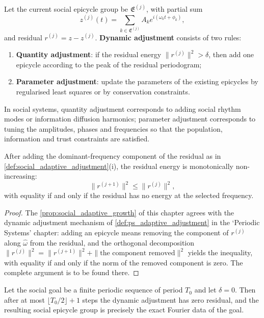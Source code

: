 \begin{definition}\label{def:social_adaptive_adjustment}
Let the current social epicycle group be $\mathfrak E^{(j)}$, with partial sum
\[
z^{(j)}(t)=\sum_{k\in\mathfrak E^{(j)}}A_k e^{i(\omega_k t+\phi_k)},
\]
and residual $r^{(j)}=z-z^{(j)}$. \textbf{Dynamic adjustment} consists of two rules:
\begin{enumerate}[label=(\roman*)]
    \item \textbf{Quantity adjustment}: if the residual energy $\|r^{(j)}\|^2>\delta$, then add one epicycle according to the peak of the residual periodogram;
    \item \textbf{Parameter adjustment}: update the parameters of the existing epicycles by regularised least squares or by conservation constraints.
\end{enumerate}
In social systems, quantity adjustment corresponds to adding social rhythm modes or information diffusion harmonics; parameter adjustment corresponds to tuning the amplitudes, phases and frequencies so that the population, information and trust constraints are satisfied.
\end{definition}

\begin{proposition}\label{prop:social_adaptive_growth}
After adding the dominant-frequency component of the residual as in \cref{def:social_adaptive_adjustment}(i), the residual energy is monotonically non-increasing:
\[
\|r^{(j+1)}\|^2\le\|r^{(j)}\|^2,
\]
with equality if and only if the residual has no energy at the selected frequency.
\end{proposition}

\begin{proof}
The \cref{prop:social_adaptive_growth} of this chapter agrees with the dynamic adjustment mechanism of \cref{def:ps_adaptive_adjustment} in the `Periodic Systems' chapter:
adding an epicycle means removing the component of $r^{(j)}$ along $\hat\omega$ from the residual, and the orthogonal decomposition
$\|r^{(j)}\|^2=\|r^{(j+1)}\|^2+\|\text{the component removed}\|^2$ yields the inequality,
with equality if and only if the norm of the removed component is zero. The complete argument is to be found there.
\end{proof}

\begin{theorem}\label{thm:social_adaptive_convergence}
Let the social goal be a finite periodic sequence of period $T_0$ and let $\delta=0$. Then after at most $\lfloor T_0/2\rfloor+1$ steps the dynamic adjustment has zero residual, and the resulting social epicycle group is precisely the exact Fourier data of the goal.
\end{theorem}

